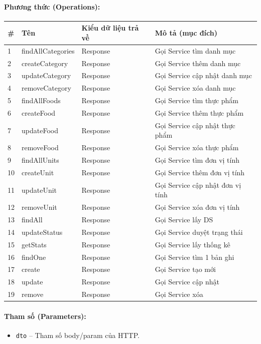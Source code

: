 \documentclass[12pt,a4paper]{article}
\begin{document}
\paragraph{Phương thức (Operations):}
\begin{longtable}{|p{0.6cm}|p{3.8cm}|p{2.6cm}|p{6.5cm}|}
\hline
\textbf{\#} & \textbf{Tên} & \textbf{Kiểu dữ liệu trả về} & \textbf{Mô tả (mục đích)} \\ \hline
\endhead
1 & findAllCategories & Response & Gọi Service tìm danh mục \\ \hline
2 & createCategory & Response & Gọi Service thêm danh mục \\ \hline
3 & updateCategory & Response & Gọi Service cập nhật danh mục \\ \hline
4 & removeCategory & Response & Gọi Service xóa danh mục \\ \hline
5 & findAllFoods & Response & Gọi Service tìm thực phẩm \\ \hline
6 & createFood & Response & Gọi Service thêm thực phẩm \\ \hline
7 & updateFood & Response & Gọi Service cập nhật thực phẩm \\ \hline
8 & removeFood & Response & Gọi Service xóa thực phẩm \\ \hline
9 & findAllUnits & Response & Gọi Service tìm đơn vị tính \\ \hline
10 & createUnit & Response & Gọi Service thêm đơn vị tính \\ \hline
11 & updateUnit & Response & Gọi Service cập nhật đơn vị tính \\ \hline
12 & removeUnit & Response & Gọi Service xóa đơn vị tính \\ \hline
13 & findAll & Response & Gọi Service lấy DS \\ \hline
14 & updateStatus & Response & Gọi Service duyệt trạng thái \\ \hline
15 & getStats & Response & Gọi Service lấy thống kê \\ \hline
16 & findOne & Response & Gọi Service tìm 1 bản ghi \\ \hline
17 & create & Response & Gọi Service tạo mới \\ \hline
18 & update & Response & Gọi Service cập nhật \\ \hline
19 & remove & Response & Gọi Service xóa \\ \hline
\end{longtable}

\paragraph{Tham số (Parameters):}
\begin{itemize}[leftmargin=*]
    \item \texttt{dto} – Tham số body/param của HTTP.
\end{itemize}
\end{document}
